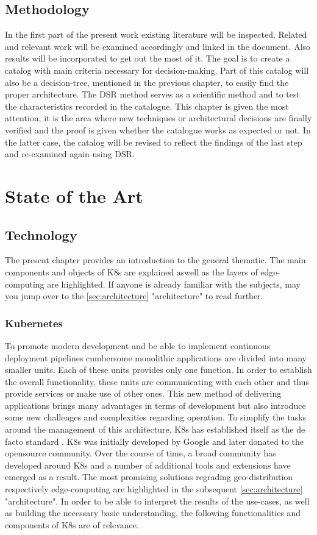 \documentclass[MSC,Master,english]{twbook}%
\begin{document}
\section{Methodology}
\label{sec:methodology}
In the first part of the present work existing literature will be inspected. Related and relevant work will be examined accordingly and linked in the document. Also results will be incorporated to get out the most of it. The goal is to create a catalog with main criteria necessary for decision-making. Part of this catalog will also be a decision-tree, mentioned in the previous chapter, to easily find the proper architecture. The \ac{DSR} method serves as a scientific method and to test the characteristics recorded in the catalogue. This chapter is given the most attention, it is the area where new techniques or architectural decisions are finally verified and the proof is given whether the catalogue works as expected or not. In the latter case, the catalog will be revised to reflect the findings of the last step and re-examined again using \ac{DSR}.


\chapter{State of the Art}
\label{chap:current}
\section{Technology}
The present chapter provides an introduction to the general thematic. The main components and objects of \ac{K8s} are explained aswell as the layers of edge-computing are highlighted. If anyone is already familiar with the subjects, may you jump over to the \autoref{sec:architecture} "architecture" to read further.
\label{sec:technology}
\subsection{Kubernetes}
To promote modern development and be able to implement continuous deployment pipelines cumbersome monolithic applications are divided into many smaller units. Each of these units provides only one function. In order to establish the overall functionality, these units are communicating with each other and thus provide services or make use of other ones. This new method of delivering applications brings many advantages in terms of development but also introduce some new challenges and complexities regarding operation. To simplify the tasks around the management of this architecture, \ac{K8s} has established itself as the de facto standard \cite{k8ssurv}. \ac{K8s} was initially developed by Google and later donated to the opensource community. Over the course of time, a broad community has developed around \ac{K8s} and a number of additional tools and extensions have emerged as a result. The most promising solutions regrading geo-distribution respectively edge-computing are highlighted in the subsequent \autoref{sec:architecture} "architecture". In order to be able to interpret the results of the use-cases, as well as building the necessary basic understanding, the following functionalities and components of \ac{K8s} are of relevance.  
\end{document}
